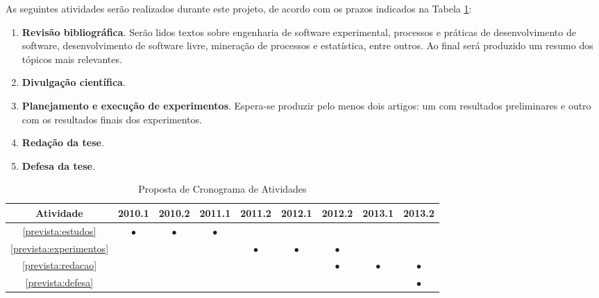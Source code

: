 \documentclass{article}
\newcommand{\newrow}{\\\hline}
\newcommand{\x}{$\bullet$}
\begin{document}
As seguintes atividades serão realizados durante este projeto, de acordo com os
prazos indicados na Tabela \ref{tab:cronograma}:

\begin{enumerate}
  \item \label{prevista:estudos}
    \textbf{Revisão bibliográfica}. Serão lidos textos sobre engenharia de software
    experimental, processos e práticas de desenvolvimento de software,
    desenvolvimento de software livre, mineração de processos e estatística,
    entre outros. Ao final será produzido um resumo dos tópicos mais relevantes.
  \item \label{prevista:artigos}
    \textbf{Divulgação científica}.
  \item \label{prevista:experimentos}
    \textbf{Planejamento e execução de experimentos}. Espera-se produzir pelo menos dois
    artigos: um com resultados preliminares e outro com os resultados finais dos
    experimentos.
  \item \label{prevista:redacao}
    \textbf{Redação da tese}.
  \item \label{prevista:defesa}
    \textbf{Defesa da tese}.
\end{enumerate}

\begin{table}[h]
  \centering
  \begin{tabular}{|c|c|c|c|c|c|c|c|c|} \hline
    Atividade                   & 2010.1 & 2010.2 & 2011.1 & 2011.2  & 2012.1 & 2012.2  & 2013.1 & 2013.2 \newrow
    \ref{prevista:estudos}      & \x     & \x     & \x     &         &        &         &        &        \newrow
    \ref{prevista:experimentos} &        &        &        & \x      & \x     & \x      &        &        \newrow
    \ref{prevista:redacao}      &        &        &        &         &        & \x      & \x     & \x     \newrow
    \ref{prevista:defesa}       &        &        &        &         &        &         &        & \x     \newrow
  \end{tabular}
 \caption{Proposta de Cronograma de Atividades}
 \label{tab:cronograma}
\end{table}




\end{document}
